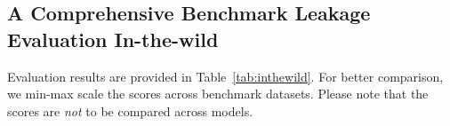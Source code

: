

\subsection{A Comprehensive Benchmark Leakage Evaluation In-the-wild}
\label{sec:inthewild}
Evaluation results are provided in Table~\ref{tab:inthewild}.
For better comparison, we min-max scale the scores across benchmark datasets.
Please note that the scores are \textit{not} to be compared across models.